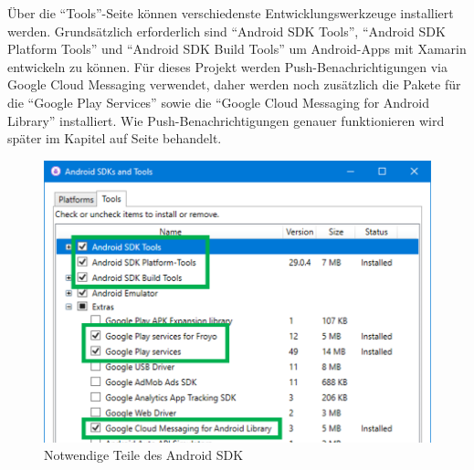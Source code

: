 Über die \enquote{Tools}-Seite können verschiedenste Entwicklungswerkzeuge installiert werden.
Grundsätzlich erforderlich sind \enquote{Android SDK Tools}, \enquote{Android SDK Platform Tools} und \enquote{Android SDK Build Tools} um Android-Apps mit Xamarin entwickeln zu können.
Für dieses Projekt werden Push-Benachrichtigungen via Google Cloud Messaging verwendet, daher werden noch zusätzlich die Pakete für die \enquote{Google Play Services} sowie die \enquote{Google Cloud Messaging for Android Library} installiert.
Wie Push-Benachrichtigungen genauer funktionieren wird später im Kapitel  auf Seite \pageref{ch:push} behandelt.
\begin{figure}[H]
    \centering\includegraphics[width=0.8\linewidth]{images/auswahl_rahmenwerk/android_sdk_auswahl.png}    
    \caption{Notwendige Teile des Android SDK}
\end{figure}

